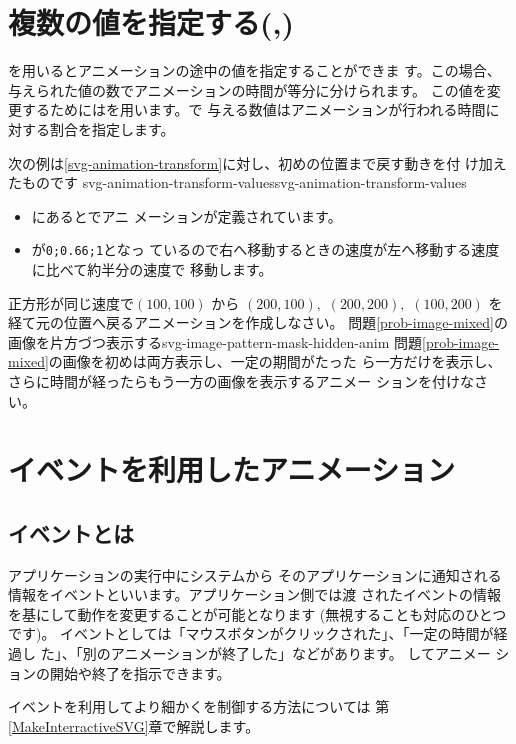 \section{複数の値を指定する(,)}
を用いるとアニメーションの途中の値を指定することができま
す。この場合、与えられた値の数でアニメーションの時間が等分に分けられます。
この値を変更するためにはを用います。で
与える数値はアニメーションが行われる時間に対する割合を指定します。

次の例は\ref{svg-animation-transform}に対し、初めの位置まで戻す動きを付
け加えたものです%
{}
{svg-animation-transform-values}{svg-animation-transform-values}
\begin{itemize}
 \item {}にあるとでアニ
メーションが定義されています。
 \item {}が\texttt{0;0.66;1}となっ
ているので右へ移動するときの速度が左へ移動する速度に比べて約半分の速度で
移動します。
\end{itemize}
{ 正方形が同じ速度で$(100,100)$ から $(200,100),$ $(200,200),$
$(100,200)$ を経て元の位置へ戻るアニメーションを作成しなさい。}
\ifSeminor
\else
{}
{問題\ref{prob-image-mixed}の画像を片方づつ表示する}{svg-image-pattern-mask-hidden-anim}
{ 問題\ref{prob-image-mixed}の画像を初めは両方表示し、一定の期間がたった
ら一方だけを表示し、さらに時間が経ったらもう一方の画像を表示するアニメー
ションを付けなさい。}
\fi
\ifSeminor
\else
\section{イベントを利用したアニメーション}
\subsection{イベントとは}
アプリケーションの実行中にシステムから
そのアプリケーションに通知される情報をイベントといいます。アプリケーション側では渡
されたイベントの情報を基にして動作を変更することが可能となります
(無視することも対応のひとつです)。
イベントとしては「マウスボタンがクリックされた」、「一定の時間が経過し
た」、「別のアニメーションが終了した」などがあります。
%
してアニメー
ションの開始や終了を指示できます。
\iffalse
イベントとしては次のようなものがあります。
\begin{itemize}
 \item マウスボタンがクリックされた。
 \item 一定の時間が経過した。
 \item 別のアニメーションが終了した。
\end{itemize}
\fi
イベントを利用してより細かく\SVG を制御する方法については
第\ref{MakeInterractiveSVG}章で解説します。

